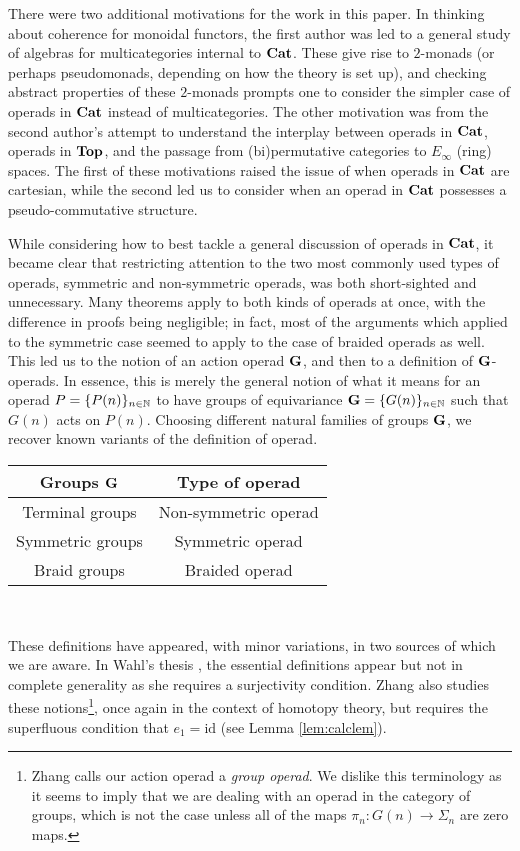 There were two additional motivations for the work in this paper.  In thinking about coherence for monoidal functors, the first author was led to a general study of algebras for multicategories internal to $\mathbf{Cat}$.  These give rise to $2$-monads (or perhaps pseudomonads, depending on how the theory is set up), and checking abstract properties of these $2$-monads prompts one to consider the simpler case of operads in $\mathbf{Cat}$ instead of multicategories.  The other motivation was from the second author's attempt to understand the interplay between operads in $\mathbf{Cat}$, operads in $\mathbf{Top}$, and the passage from (bi)permutative categories to $E_{\infty}$ (ring) spaces.  The first of these motivations raised the issue of when operads in $\mathbf{Cat}$ are cartesian, while the second led us to consider when an operad in $\mathbf{Cat}$ possesses a pseudo-commutative structure.

While considering how to best tackle a general discussion of operads in $\mathbf{Cat}$, it became clear that restricting attention to the two most commonly used types of operads, symmetric and non-symmetric operads, was both short-sighted and unnecessary.  Many theorems apply to both kinds of operads at once, with the difference in proofs being negligible; in fact, most of the arguments which applied to the symmetric case seemed to apply to the case of braided operads as well.   This led us to the notion of an action operad $\mathbf{G}$, and then to a definition of $\mathbf{G}$-operads.  In essence, this is merely the general notion of what it means for an operad $P = \{ P(n) \}_{n \in \mathbb{N}}$ to have groups of equivariance $\mathbf{G} = \{ G(n) \}_{n \in \mathbb{N}}$ such that $G(n)$ acts on $P(n)$.  Choosing different natural families of groups $\mathbf{G}$, we recover known variants of the definition of operad. \\ \begin{center}
\begin{tabular}{c|c}
Groups $\mathbf{G}$ & Type of operad  \\ \hline
Terminal groups & Non-symmetric operad \\
Symmetric groups & Symmetric operad \\
Braid groups & Braided operad \\
\end{tabular} \\ \end{center}
These definitions have appeared, with minor variations, in two sources of which we are aware.  In Wahl's thesis \cite{wahl-thesis}, the essential definitions appear but not in complete generality as she requires a surjectivity condition.  Zhang \cite{zhang-grp} also studies these notions\footnote{Zhang calls our action operad a \textit{group operad}.  We dislike this terminology as it seems to imply that we are dealing with an operad in the category of groups, which is not the case unless all of the maps $\pi_{n}:G(n) \rightarrow \Sigma_{n}$ are zero maps.}, once again in the context of homotopy theory, but requires the  superfluous condition that $e_{1} = \textrm{id}$ (see Lemma \ref{lem:calclem}).


